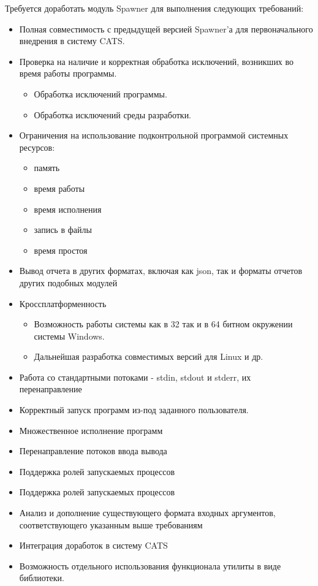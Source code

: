 \documentclass{imcs}
\begin{document}
Требуется доработать модуль Spawner для выполнения следующих требований:
\begin{itemize}
  \item Полная совместимость с предыдущей версией Spawner’а для первоначального внедрения в систему CATS.
  \item Проверка на наличие и корректная обработка исключений, возникших во время работы программы.
  \begin{itemize}
    \item Обработка исключений программы.
    \item Обработка исключений среды разработки.
  \end{itemize}
  \item Ограничения на использование подконтрольной программой системных ресурсов:
  \begin{itemize}
    \item память
    \item время работы
    \item время исполнения
    \item запись в файлы
    \item время простоя
  \end{itemize}
  \item Вывод отчета в других форматах, включая как json, так и форматы отчетов других подобных модулей
  \item Кроссплатформенность
  \begin{itemize}
    \item Возможность работы системы как в 32 так и в 64 битном окружении системы Windows.
    \item Дальнейшая разработка совместимых версий для Linux и др.
  \end{itemize}
  \item Работа со стандартными потоками - stdin, stdout и stderr, их перенаправление
  \item Корректный запуск программ из-под заданного пользователя.
  \item Множественное исполнение программ
  \item Перенаправление потоков ввода вывода
  \item Поддержка ролей запускаемых процессов
  \item Поддержка ролей запускаемых процессов
  \item Анализ и дополнение существующего формата входных аргументов, соответствующего указанным выше требованиям
  \item Интеграция доработок в систему CATS
  \item Возможность отдельного использования функционала утилиты в виде библиотеки.
\end{itemize}
\end{document}

